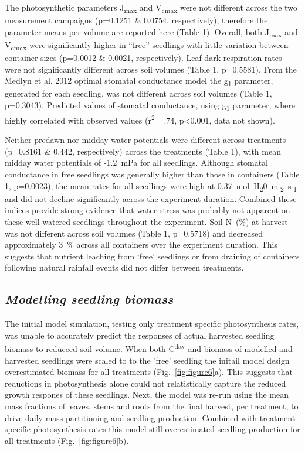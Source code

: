 \documentclass[a4paper]{article}\usepackage[]{graphicx}\usepackage[]{color}
\begin{document}
The photosynthetic parameters J\textsubscript{max} and V\textsubscript{cmax} were not different across the two measurement campaigns (p=0.1251 \& 0.0754, respectively), therefore the parameter means per volume are reported here (Table 1).  Overall, both J\textsubscript{max} and V\textsubscript{cmax} were significantly higher in “free” seedlings with little variation between container sizes (p=0.0012 \& 0.0021, respectively). Leaf dark respiration rates were not significantly different across soil volumes (Table 1, p=0.5581). From the Medlyn et al. 2012 optimal stomatal conductance model the g\textsubscript{1} parameter, generated for each seedling, was not different across soil volumes (Table 1, p=0.3043). Predicted values of stomatal conductance, using g\textsubscript{1} parameter, where highly correlated with observed values (r\textsuperscript{2}= .74, p\textless0.001, data not shown).

Neither predawn nor midday water potentials were different across treatments (p=0.8161 \& 0.442, respectively) across the treatments (Table 1), with mean midday water potentials of -1.2~mPa for all seedlings. Although stomatal conductance in free seedlings was generally higher than those in containers (Table 1, p=0.0023), the mean rates for all seedlings were high at 0.37~mol~H\textsubscript{2}0~m\textsubscript{-2}~s\textsubscript{-1} and did not decline significantly across the experiment duration. Combined these indices provide strong evidence that water stress was probably not apparent on these well-watered seedlings throughout the experiment. Soil N~(\%) at harvest was not different across soil volumes (Table 1, p=0.5718) and decreased approximately 3~\% across all containers over the experiment duration. This suggests that nutrient leaching from ‘free’ seedlings or from draining of containers following natural rainfall events did not differ between treatments. 

\subsection*{\textit{Modelling seedling biomass}}
The initial model simulation, testing only treatment specific photosynthesis rates, was unable to accurately predict the responses of actual harvested seedling biomass to reducecd soil volume.  When both C\textsuperscript{day} and biomass of modelled and harvested seedlings were scaled to to the 'free' seedling the initail model design overestimated biomass for all treatments (Fig.~\ref{fig:figure6}a).  This suggests that reductions in photosynthesis alone could not relatistically capture the reduced growth respones of these seedlings.  Next, the model was re-run using the mean mass fractions of leaves, stems and roots from the final harvest, per treatment, to drive daily mass partitioning and seedling production.  Combined with treatment specific photosynthesis rates this model still overestimated seedling production for all treatments (Fig.~\ref{fig:figure6}b).  
\end{document}

